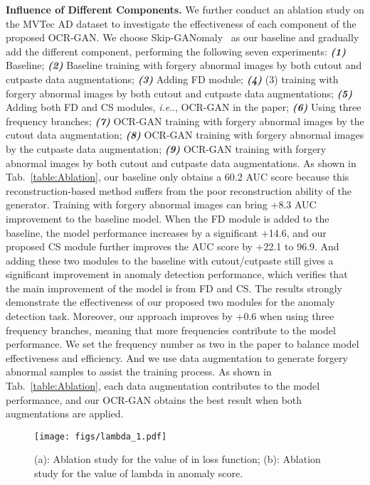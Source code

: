 \documentclass[lettersize,journal]{IEEEtran}
\makeatletter
\DeclareRobustCommand\onedot{\futurelet\@let@token\@onedot}
\def\@onedot{\ifx\@let@token.\else.\null\fi\xspace}
\def\ie{\emph{i.e}\onedot} \def\Ie{\emph{I.e}\onedot}
\makeatother
\begin{document}
\noindent\textbf{Influence of Different Components.} We further conduct an ablation study on the MVTec AD dataset to investigate the effectiveness of each component of the proposed OCR-GAN. We choose Skip-GANomaly~\cite{akccay2019skip} as our baseline and gradually add the different component, performing the following seven experiments: \textbf{\emph{(1)}} Baseline; \textbf{\emph{(2)}} Baseline training with forgery abnormal images by both cutout and cutpaste data augmentations; \textbf{\emph{(3)}} Adding FD module; \textbf{\emph{(4)}} (3) training with forgery abnormal images by both cutout and cutpaste data augmentations; \textbf{\emph{(5)}} Adding both FD and CS modules, \ie, OCR-GAN in the paper; \textbf{\emph{(6)}} Using three frequency branches; \textbf{\emph{(7)}} OCR-GAN training with forgery abnormal images by the cutout data augmentation; \textbf{\emph{(8)}} OCR-GAN training with forgery abnormal images by the cutpaste data augmentation; \textbf{\emph{(9)}} OCR-GAN training with forgery abnormal images by both cutout and cutpaste data augmentations. As shown in Tab.~\ref{table:Ablation}, our baseline only obtains a 60.2 AUC score because this reconstruction-based method suffers from the poor reconstruction ability of the generator. Training with forgery abnormal images can bring +8.3 AUC improvement to the baseline model. When the FD module is added to the baseline, the model performance increases by a significant +14.6, and our proposed CS module further improves the AUC score by +22.1 to 96.9. And adding these two modules to the baseline with cutout/cutpaste still gives a significant improvement in anomaly detection performance, which verifies that the main improvement of the model is from FD and CS. The results strongly demonstrate the effectiveness of our proposed two modules for the anomaly detection task. Moreover, our approach improves by +0.6 when using three frequency branches, meaning that more frequencies contribute to the model performance. We set the frequency number as two in the paper to balance model effectiveness and efficiency. And we use data augmentation to generate forgery abnormal samples to assist the training process. As shown in Tab.~\ref{table:Ablation}, each data augmentation contributes to the model performance, and our OCR-GAN obtains the best result when both augmentations are applied.
\begin{figure*}[t]
    \centering
    \texttt{[image: figs/lambda\_1.pdf]}
    \caption{(a): Ablation study for the value of  in loss function; (b): Ablation study for the value of lambda in anomaly score.}
    \label{fig:lambda}
\end{figure*}
\end{document}
